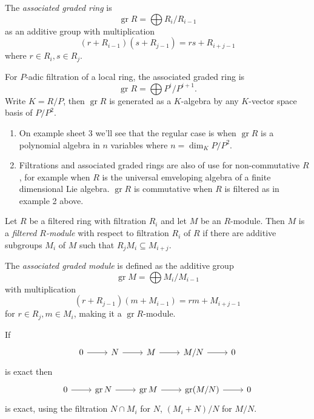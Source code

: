 \documentclass[a4paper]{article}
\DeclareMathOperator{\gr}{gr} %
\begin{document}
\begin{definition}
  The \emph{associated graded ring} is
  \[
    \gr R = \bigoplus R_i/R_{i - 1}
  \]
  as an additive group with multiplication
  \[
    (r + R_{i - 1}) (s + R_{j - 1}) = rs + R_{i + j - 1}
  \]
  where \(r \in R_i, s \in R_j\).
\end{definition}

\begin{eg}
  For \(P\)-adic filtration of a local ring, the associated graded ring is
  \[
    \gr R = \bigoplus P^i/P^{i + 1}.
  \]
  Write \(K = R/P\), then \(\gr R\) is generated as a \(K\)-algebra by any \(K\)-vector space basis of \(P/P^2\).
\end{eg}

\begin{remark}\leavevmode
  \begin{enumerate}
  \item On example sheet 3 we'll see that the regular case is when \(\gr R\) is a polynomial algebra in \(n\) variables where \(n = \dim_K P/P^2\).
  \item Filtrations and associated graded rings are also of use for non-commutative \(R\), for example when \(R\) is the universal emveloping algebra of a finite dimensional Lie algebra. \(\gr R\) is commutative when \(R\) is filtered as in example 2 above.
  \end{enumerate}
\end{remark}

\begin{definition}
  Let \(R\) be a filtered ring with filtration \(R_i\) and let \(M\) be an \(R\)-module. Then \(M\) is a \emph{filtered \(R\)-module} with respect to filtration \(R_i\) of \(R\) if there are additive subgroups \(M_i\) of \(M\) such that \(R_j M_i \subseteq M_{i + j}\).

  The \emph{associated graded module} is defined as the additive group
  \[
    \gr M = \bigoplus M_i/M_{i - 1}
  \]
  with multiplication
  \[
    (r + R_{j - 1})(m + M_{i - 1}) = rm + M_{i + j - 1}
  \]
  for \(r \in R_j, m \in M_i\), making it a \(\gr R\)-module.
\end{definition}

\begin{lemma}
  If
  \[
    \begin{tikzcd}
      0 \ar[r] & N \ar[r] & M \ar[r] & M/N \ar[r] & 0
    \end{tikzcd}
  \]
  is exact then
  \[
    \begin{tikzcd}
      0 \ar[r] & \gr N \ar[r] & \gr M \ar[r] & \gr (M/N) \ar[r] & 0
    \end{tikzcd}
  \]
  is exact, using the filtration \(N \cap M_i\) for \(N\), \((M_i + N)/N\) for \(M/N\).
\end{lemma}
\end{document}
